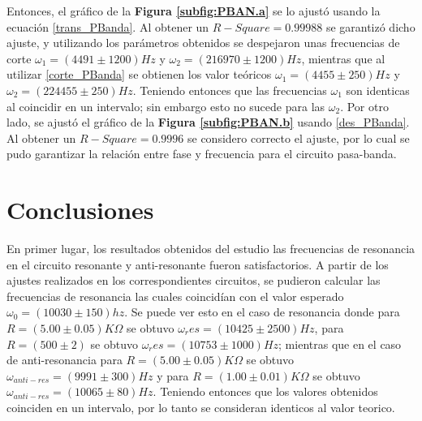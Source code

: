 \documentclass[11pt,a4paper]{article}
\begin{document}
Entonces, el gráfico de la \textbf{Figura \ref{subfig:PBAN.a}} se lo ajustó usando la ecuación \eqref{trans_PBanda}. Al obtener un $R-Square= 0.99988$ se garantizó dicho ajuste, y utilizando los parámetros obtenidos se despejaron unas frecuencias de corte $\omega_1 = (4491 \pm 1200)Hz$ y $\omega_2 = (216970 \pm 1200)Hz$, mientras que al utilizar \eqref{corte_PBanda} se obtienen los valor teóricos $\omega_1 = (4455 \pm 250) Hz$ y $\omega_2 = (224455 \pm 250) Hz$. Teniendo entonces que las frecuencias $\omega_1$ son identicas al coincidir en un intervalo; sin embargo esto no sucede para las $\omega_2$.
Por otro lado, se ajustó el gráfico de la \textbf{Figura \ref{subfig:PBAN.b}} usando \eqref{des_PBanda}. Al obtener un $R-Square = 0.9996$ se considero correcto el ajuste, por lo cual se pudo garantizar la relación entre fase y frecuencia para el circuito pasa-banda.

\label{sec:discusion}




\section{Conclusiones}

En primer lugar, los resultados obtenidos del estudio las frecuencias de resonancia en el circuito resonante y anti-resonante fueron satisfactorios. A partir de los ajustes realizados en los correspondientes circuitos, se pudieron calcular las frecuencias de resonancia las cuales coincidían con el valor esperado $\omega_0 = (10030 \pm 150)hz$. Se puede ver esto en el caso de resonancia donde para $R=(5.00 \pm 0.05)K\Omega$ se obtuvo $\omega_res = (10425 \pm 2500)Hz$, para $R= (500 \pm 2)$  se obtuvo $\omega_res = (10753 \pm 1000)Hz$; mientras que en el caso de anti-resonancia para $R=(5.00 \pm 0.05)K\Omega$ se obtuvo $\omega_{anti-res} = (9991 \pm 300)Hz$ y para $R=(1.00 \pm 0.01)K\Omega$ se obtuvo $\omega_{anti-res} = (10065 \pm 80)Hz$. Teniendo entonces que los valores obtenidos coinciden en un intervalo, por lo tanto se consideran identicos al valor teorico. 
\end{document}
